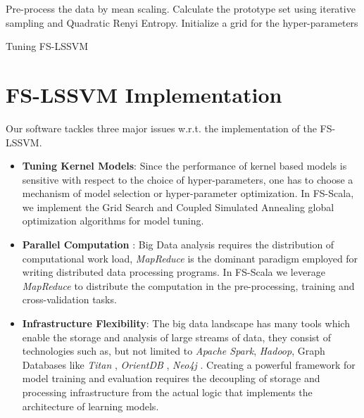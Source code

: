 \documentclass[conference, cmex10]{IEEEtran}
\begin{document}
\begin{algorithm} \label{lssvmalgo}
\SetAlgoLined
{}
 Pre-process the data by mean scaling.\;
 Calculate the prototype set using iterative 
 sampling and Quadratic Renyi Entropy.\;
 Initialize a grid for the hyper-parameters\;
 \caption{Tuning FS-LSSVM}
\end{algorithm}

\section{FS-LSSVM Implementation} \label{fsimpl}

Our software tackles three major issues w.r.t. the implementation of the FS-LSSVM.

\begin{itemize}
\item \textbf{Tuning Kernel Models}:
Since the performance of kernel based models is sensitive with respect to the choice of hyper-parameters, one has to choose a mechanism of model selection or hyper-parameter optimization. In FS-Scala, we implement the Grid Search and Coupled Simulated Annealing global optimization algorithms for model tuning.

\item \textbf{Parallel Computation} \label{mr}:
Big Data analysis requires the distribution of computational work load, \textit{MapReduce} is the dominant paradigm employed for writing distributed data processing programs. In FS-Scala we leverage \textit{MapReduce} to distribute the computation in the pre-processing, training and cross-validation tasks.

\item \textbf{Infrastructure Flexibility}:
The big data landscape has many tools which enable the storage and analysis of large streams of data, they consist of technologies such as, but not limited to \textit{Apache Spark}, \textit{Hadoop}, Graph Databases like \textit{Titan} \cite{Titan:2014}, \textit{OrientDB} \cite{OrientDB:2010}, \textit{Neo4j} \cite{Neo4j:2010}. Creating a powerful framework for model training and evaluation requires the decoupling of storage and processing infrastructure from the actual logic that implements the architecture of learning models.
\end{itemize}
\end{document}
